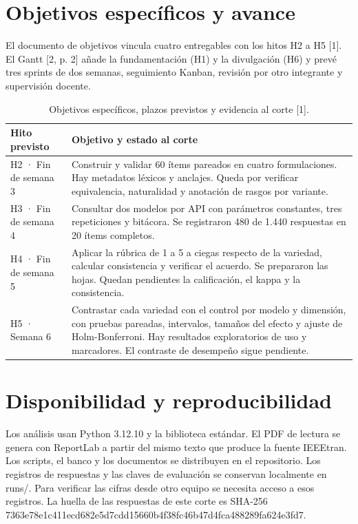 \documentclass[conference]{IEEEtran}
\begin{document}
\section{Objetivos específicos y avance}
El documento de objetivos vincula cuatro entregables con los hitos H2 a H5 [1]. El Gantt [2, p. 2] añade la fundamentación (H1) y la divulgación (H6) y prevé tres sprints de dos semanas, seguimiento Kanban, revisión por otro integrante y supervisión docente.

\begin{table}[!t]
\centering
\caption{Objetivos específicos, plazos previstos y evidencia al corte [1].}
\footnotesize
\begin{tabularx}{\columnwidth}{>{\raggedright\arraybackslash}X>{\raggedright\arraybackslash}X}
\toprule
Hito previsto & Objetivo y estado al corte \\
\midrule
H2 · Fin de semana 3 & Construir y validar 60 ítems pareados en cuatro formulaciones. Hay metadatos léxicos y anclajes. Queda por verificar equivalencia, naturalidad y anotación de rasgos por variante. \\
H3 · Fin de semana 4 & Consultar dos modelos por API con parámetros constantes, tres repeticiones y bitácora. Se registraron 480 de 1.440 respuestas en 20 ítems completos. \\
H4 · Fin de semana 5 & Aplicar la rúbrica de 1 a 5 a ciegas respecto de la variedad, calcular consistencia y verificar el acuerdo. Se prepararon las hojas. Quedan pendientes la calificación, el kappa y la consistencia. \\
H5 · Semana 6 & Contrastar cada variedad con el control por modelo y dimensión, con pruebas pareadas, intervalos, tamaños del efecto y ajuste de Holm-Bonferroni. Hay resultados exploratorios de uso y marcadores. El contraste de desempeño sigue pendiente. \\
\bottomrule
\end{tabularx}
\end{table}
\section{Disponibilidad y reproducibilidad}
Los análisis usan Python 3.12.10 y la biblioteca estándar. El PDF de lectura se genera con ReportLab a partir del mismo texto que produce la fuente IEEEtran. Los scripts, el banco y los documentos se distribuyen en el repositorio. Los registros de respuestas y las claves de evaluación se conservan localmente en runs/. Para verificar las cifras desde otro equipo se necesita acceso a esos registros. La huella de las respuestas de este corte es SHA-256 7363e78e1c411ecd682e5d7cdd15660b4f38fc46b47d4fca488289fa624e3fd7.
\end{document}
